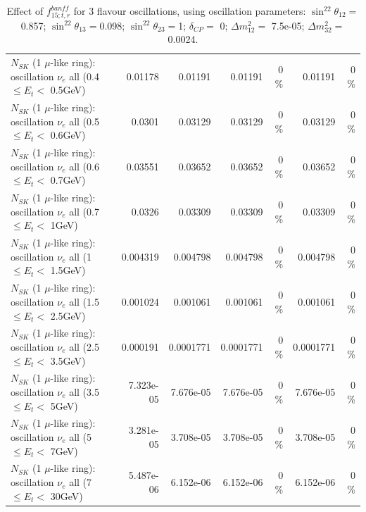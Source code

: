 \begin{table}
\begin{tabular}{| l | r | r | r  r | r  r |}
$N_{SK}$ (1 $\mu$-like ring): oscillation $\nu_{e}$ all (0.4 $\leq E_{t} <$ 0.5GeV) &         0.01178 &         0.01191 &         0.01191 &        0 \%  &         0.01191 &        0 \%  \\ 
$N_{SK}$ (1 $\mu$-like ring): oscillation $\nu_{e}$ all (0.5 $\leq E_{t} <$ 0.6GeV) &          0.0301 &         0.03129 &         0.03129 &        0 \%  &         0.03129 &        0 \%  \\ 
$N_{SK}$ (1 $\mu$-like ring): oscillation $\nu_{e}$ all (0.6 $\leq E_{t} <$ 0.7GeV) &         0.03551 &         0.03652 &         0.03652 &        0 \%  &         0.03652 &        0 \%  \\ 
$N_{SK}$ (1 $\mu$-like ring): oscillation $\nu_{e}$ all (0.7 $\leq E_{t} <$ 1GeV) &          0.0326 &         0.03309 &         0.03309 &        0 \%  &         0.03309 &        0 \%  \\ 
$N_{SK}$ (1 $\mu$-like ring): oscillation $\nu_{e}$ all (1 $\leq E_{t} <$ 1.5GeV) &        0.004319 &        0.004798 &        0.004798 &        0 \%  &        0.004798 &        0 \%  \\ 
$N_{SK}$ (1 $\mu$-like ring): oscillation $\nu_{e}$ all (1.5 $\leq E_{t} <$ 2.5GeV) &        0.001024 &        0.001061 &        0.001061 &        0 \%  &        0.001061 &        0 \%  \\ 
$N_{SK}$ (1 $\mu$-like ring): oscillation $\nu_{e}$ all (2.5 $\leq E_{t} <$ 3.5GeV) &        0.000191 &       0.0001771 &       0.0001771 &        0 \%  &       0.0001771 &        0 \%  \\ 
$N_{SK}$ (1 $\mu$-like ring): oscillation $\nu_{e}$ all (3.5 $\leq E_{t} <$ 5GeV) &       7.323e-05 &       7.676e-05 &       7.676e-05 &        0 \%  &       7.676e-05 &        0 \%  \\ 
 $N_{SK}$ (1 $\mu$-like ring): oscillation $\nu_{e}$ all (5 $\leq E_{t} <$ 7GeV) &       3.281e-05 &       3.708e-05 &       3.708e-05 &        0 \%  &       3.708e-05 &        0 \%  \\ 
$N_{SK}$ (1 $\mu$-like ring): oscillation $\nu_{e}$ all (7 $\leq E_{t} <$ 30GeV) &       5.487e-06 &       6.152e-06 &       6.152e-06 &        0 \%  &       6.152e-06 &        0 \%  \\ 
\hline
\hline
\end{tabular}
\caption{ Effect of $f_{15; t, r}^{banff}$ for 3 flavour oscillations, using oscillation parameters:  $\sin^22\theta_{12} = $0.857; $\sin^22\theta_{13} = $0.098; $\sin^22\theta_{23} = $1; $\delta_{CP} = $        0; $\Delta m^2_{12} = $    7.5e-05; $\Delta m^2_{32} = $    0.0024. }
\label{tab:num_banff_15_1RmuT_3f_osc_t13:0.098}
\end{table}
